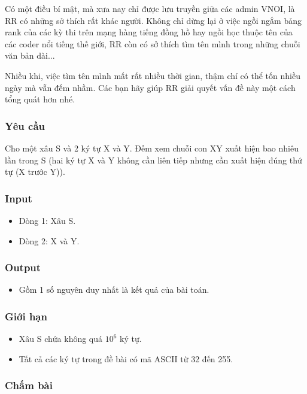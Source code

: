 



   Có một điều bí mật, mà xưa nay chỉ được lưu truyền giữa các admin VNOI, là RR có những sở thích rất khác người. Không chỉ dừng lại ở việc ngồi ngắm bảng rank của các kỳ thi trên mạng hàng tiếng đồng hồ hay ngồi học thuộc tên của các coder nổi tiếng thế giới, RR còn có sở thích tìm tên mình trong những chuỗi văn bản dài...  

   Nhiều khi, việc tìm tên mình mất rất nhiều thời gian, thậm chí có thể tốn nhiều ngày mà vẫn đếm nhầm. Các bạn hãy giúp RR giải quyết vấn đề này một cách tổng quát hơn nhé.  

\subsubsection{   Yêu cầu  }

   Cho một xâu S và 2 ký tự X và Y. Đếm xem chuỗi con XY xuất hiện bao nhiêu lần trong S (hai ký tự X và Y không cần liên tiếp nhưng cần xuất hiện đúng thứ tự (X trước Y)).  

\subsubsection{   Input  }
\begin{itemize}
	\item     Dòng 1: Xâu S.   
	\item     Dòng 2: X và Y.   
\end{itemize}

\subsubsection{   Output  }
\begin{itemize}
	\item     Gồm 1 số nguyên duy nhất là kết quả của bài toán.   
\end{itemize}

\subsubsection{   Giới hạn  }
\begin{itemize}
	\item     Xâu S chứa không quá $10^{6}$    ký tự.   
	\item     Tất cả các ký tự trong đề bài có mã ASCII từ 32 đến 255.   
\end{itemize}

\subsubsection{   Chấm bài  }

